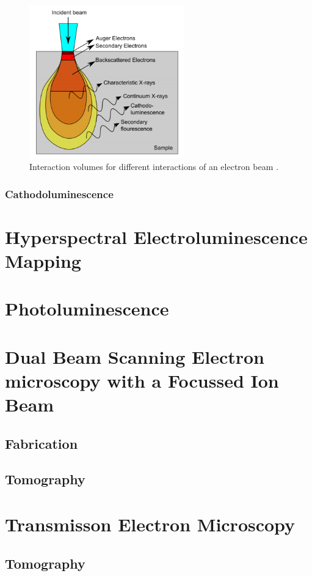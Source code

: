 \begin{figure}[h]
	\centering
	\includegraphics[width=0.6\textwidth]{Figs/Ch2/int.png}
	\caption {Interaction volumes for different interactions of an electron beam \cite{Puchtler2014}.}
	\label{2.5}
\end{figure}
\FloatBarrier

\subsubsection{Cathodoluminescence}


\section{Hyperspectral Electroluminescence Mapping}
\section{Photoluminescence}
\section{Dual Beam Scanning Electron microscopy with a Focussed Ion Beam}
\subsection{Fabrication}
\subsection{Tomography}
\section{Transmisson Electron Microscopy}
\subsection{Tomography}


